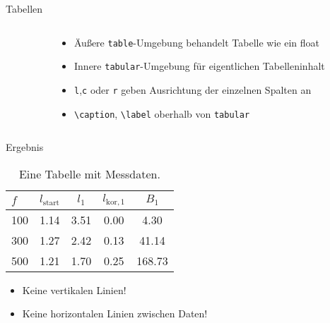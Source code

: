 \begin{frame}[fragile]{Tabellen}
\begin{columns}[onlytextwidth, t]
\begin{column}{0.60\textwidth}
    \end{column}
    \begin{column}{0.36\textwidth}
      \begin{itemize}
        \item Äußere \texttt{table}-Umgebung behandelt Tabelle wie ein float
        \item Innere \texttt{tabular}-Umgebung für eigentlichen Tabelleninhalt
        \item \texttt{l},\texttt{c} oder \texttt{r} geben Ausrichtung der einzelnen Spalten an
        \item \lstinline+\caption+, \lstinline+\label+ oberhalb von \texttt{tabular}
      \end{itemize}
    \end{column}
  \end{columns}
\end{frame}

\begin{frame}{Ergebnis}
  \begin{table}
    \centering
    \caption{Eine Tabelle mit Messdaten.}
    \begin{tabular}{l c c c c}
      \toprule
      $f$ & $l_\text{start}$ & $l_1$ & $l_{\text{kor},1}$ & $B_1$ \\
      \midrule
      100 & 1.14 & 3.51 & 0.00 &   4.30 \\
      300 & 1.27 & 2.42 & 0.13 &  41.14 \\
      500 & 1.21 & 1.70 & 0.25 & 168.73 \\
      \toprule
    \end{tabular}
  \end{table}
  \begin{itemize}
    \item Keine vertikalen Linien!
    \item Keine horizontalen Linien zwischen Daten!
  \end{itemize}
\end{frame}

